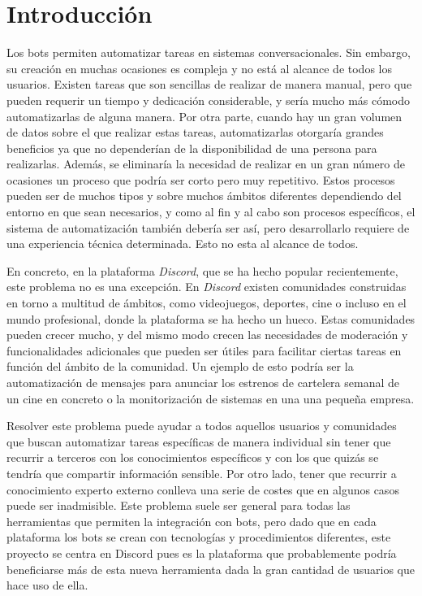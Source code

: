 \chapter{Introducción}

Los bots permiten automatizar tareas en sistemas conversacionales. Sin embargo, su creación en muchas ocasiones es compleja y no está al alcance de todos los usuarios. Existen tareas que son sencillas de realizar de manera manual, pero que pueden requerir un tiempo y dedicación considerable, y sería mucho más cómodo automatizarlas de alguna manera. Por otra parte, cuando hay un gran volumen de datos sobre el que realizar estas tareas, automatizarlas otorgaría grandes beneficios ya que no dependerían de la disponibilidad de una persona para realizarlas. Además, se eliminaría la necesidad de realizar en un gran número de ocasiones un proceso que podría ser corto pero muy repetitivo. Estos procesos pueden ser de muchos tipos y sobre muchos ámbitos diferentes dependiendo del entorno en que sean necesarios, y como al fin y al cabo son procesos específicos, el sistema de automatización también debería ser así, pero desarrollarlo requiere de una experiencia técnica determinada. Esto no esta al alcance de todos.

En concreto, en la plataforma \textit{Discord}\cite{discord}, que se ha hecho popular recientemente, este problema no es una excepción. En \textit{Discord} existen comunidades construidas en torno a multitud de ámbitos, como videojuegos, deportes, cine o incluso en el mundo profesional, donde la plataforma se ha hecho un hueco. Estas comunidades pueden crecer mucho, y del mismo modo crecen las necesidades de moderación y funcionalidades adicionales que pueden ser útiles para facilitar ciertas tareas en función del ámbito de la comunidad. Un ejemplo de esto podría ser la automatización de mensajes para anunciar los estrenos de cartelera semanal de un cine en concreto o la monitorización de sistemas en una una pequeña empresa.

Resolver este problema puede ayudar a todos aquellos usuarios y comunidades que buscan automatizar tareas específicas de manera individual sin tener que recurrir a terceros con los conocimientos específicos y con los que quizás se tendría que compartir información sensible. Por otro lado, tener que recurrir a conocimiento experto externo conlleva una serie de costes que en algunos casos puede ser inadmisible. Este problema suele ser general para todas las herramientas que permiten la integración con bots, pero dado que en cada plataforma los bots se crean con tecnologías y procedimientos diferentes, este proyecto se centra en Discord pues es la plataforma que probablemente podría beneficiarse más de esta nueva herramienta dada la gran cantidad de usuarios que hace uso de ella.

